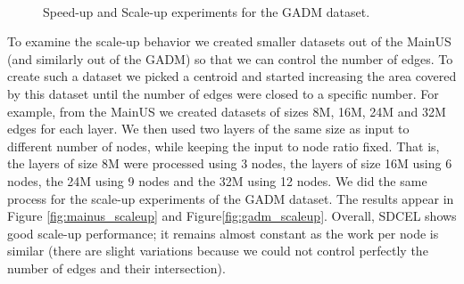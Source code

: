 \begin{figure}
    \centering
     \\%
     \vspace{-10pt}
    \caption{Speed-up and Scale-up experiments for the GADM dataset.} \label{fig:gadm_speed_scale}
\end{figure}

To examine the scale-up behavior we created smaller datasets out of the MainUS (and similarly out of the GADM) so that we can control the number of edges. 
To create such a dataset we picked a centroid and started increasing the area covered by this dataset until the number of edges were closed to a specific number. For example, from the MainUS we created datasets of sizes 8M, 16M, 24M and 32M edges for each layer. We then used two layers of the same size as input to different number of nodes, while keeping the input to node ratio fixed. That is, the layers of size 8M were processed using 3 nodes, the layers of size 16M using 6 nodes, the 24M using 9 nodes and the 32M using 12 nodes. We did the same process for the scale-up experiments of the GADM dataset. The results appear in Figure \ref{fig:mainus_scaleup} and Figure\ref{fig:gadm_scaleup}.
Overall, SDCEL shows good scale-up performance; it remains almost constant as the work per node is similar (there are slight variations because we could not control perfectly the number of edges and their intersection). 

